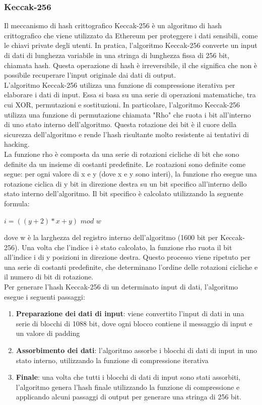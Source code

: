 \documentclass[a4paper,11pt]{report}
\begin{document}
\subsubsection{Keccak-256}
Il meccanismo di hash crittografico Keccak-256 è un algoritmo di hash crittografico che viene utilizzato da Ethereum per proteggere i dati sensibili, come le chiavi private degli utenti. In pratica, l'algoritmo Keccak-256 converte un input di dati di lunghezza variabile in una stringa di lunghezza fissa di 256 bit, chiamata hash. Questa operazione di hash è irreversibile, il che significa che non è possibile recuperare l'input originale dai dati di output.\\
L'algoritmo Keccak-256 utilizza una funzione di compressione iterativa per elaborare i dati di input. Essa si basa su una serie di operazioni matematiche, tra cui XOR, permutazioni e sostituzioni. In particolare, l'algoritmo Keccak-256 utilizza una funzione di permutazione chiamata "Rho" che ruota i bit all'interno di uno stato interno dell'algoritmo. Questa rotazione dei bit è il cuore della sicurezza dell'algoritmo e rende l'hash risultante molto resistente ai tentativi di hacking.\\
La funzione rho è composta da una serie di rotazioni cicliche di bit che sono definite da un insieme di costanti predefinite. Le roatazioni sono definite come segue: per ogni valore di x e y (dove x e y sono interi), la funzione rho esegue una rotazione ciclica di y bit in direzione destra su un bit specifico all'interno dello stato interno dell'algoritmo. Il bit specifico è calcolato utilizzando la seguente formula:
\begin{center}
    $i = ((y + 2) * x + y)$ $mod$ $w$
\end{center}
dove w è la larghezza del registro interno dell'algoritmo (1600 bit per Keccak-256).
Una volta che l'indice i è stato calcolato, la funzione rho ruota il bit all'indice i di y posizioni in direzione destra. Questo processo viene ripetuto per una serie di costanti predefinite, che determinano l'ordine delle rotazioni cicliche e il numero di bit di rotazione.\\
Per generare l'hash Keccak-256 di un determinato input di dati, l'algoritmo esegue i seguenti passaggi:
\begin{enumerate}
    \item \textbf{Preparazione dei dati di input}: viene convertito l'input di dati in una serie di blocchi di 1088 bit, dove ogni blocco contiene il messaggio di input e un valore di padding
    \item \textbf{Assorbimento dei dati}: l'algoritmo assorbe i blocchi di dati di input in uno stato interno, utilizzando la funzione di compressione iterativa
    \item \textbf{Finale}: una volta che tutti i blocchi di dati di input sono stati assorbiti, l'algoritmo genera l'hash finale utilizzando la funzione di compressione e applicando alcuni passaggi di output per generare una stringa di 256 bit.
\end{enumerate}
\end{document}
